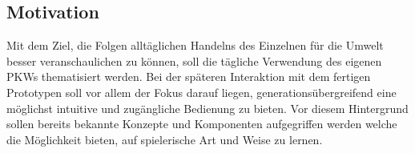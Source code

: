 \documentclass[.../Dokumentation.tex]{subfiles}
\begin{document}
\subsection{Motivation}\label{sec-intr-motivation}
Mit dem Ziel, die Folgen alltäglichen Handelns des Einzelnen für die Umwelt 
besser veranschaulichen zu können, soll die tägliche 
Verwendung des eigenen PKWs thematisiert werden.
Bei der späteren Interaktion mit dem fertigen Prototypen soll vor 
allem der Fokus darauf liegen, generationsübergreifend eine möglichst intuitive 
und zugängliche Bedienung zu bieten.
Vor diesem Hintergrund sollen bereits bekannte Konzepte und Komponenten 
aufgegriffen werden welche die Möglichkeit bieten, auf spielerische Art und 
Weise zu lernen.
\end{document}
